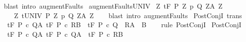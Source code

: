 \begin{isabellebody}
\ {\isacharparenleft}blast\ intro{\isacharcolon}\ augment{\isacharunderscore}Faults{\isacharparenright}%
\endisatagproof
{\isafoldproof}%
%
\isadelimproof
\isanewline
%
\endisadelimproof
\isanewline
{}\isamarkupfalse%
\ augment{\isacharunderscore}FaultsUNIV{\isacharcolon}\isanewline
\ {\isachardoublequoteopen}{\isasymlbrakk}{\isasymforall}Z{\isachardot}\ {\isasymGamma}{\isacharcomma}{\isacharbraceleft}{\isacharbraceright}{\isasymturnstile}\isactrlsub t\isactrlbsub {\isacharslash}F\isactrlesub \ {\isacharparenleft}P\ Z{\isacharparenright}\ p\ {\isacharparenleft}Q\ Z{\isacharparenright}{\isacharcomma}{\isacharparenleft}A\ Z{\isacharparenright}{\isasymrbrakk}\ {\isasymLongrightarrow}\ \isanewline
\ \ \ \ {\isasymforall}Z{\isachardot}\ {\isasymGamma}{\isacharcomma}{\isacharbraceleft}{\isacharbraceright}{\isasymturnstile}\isactrlsub t\isactrlbsub {\isacharslash}UNIV\isactrlesub \ {\isacharparenleft}P\ Z{\isacharparenright}\ p\ {\isacharparenleft}Q\ Z{\isacharparenright}{\isacharcomma}{\isacharparenleft}A\ Z{\isacharparenright}{\isachardoublequoteclose}\isanewline
%
\isadelimproof
\ \ %
\endisadelimproof
%
\isatagproof
{}\isamarkupfalse%
\ {\isacharparenleft}blast\ intro{\isacharcolon}\ augment{\isacharunderscore}Faults{\isacharparenright}%
\endisatagproof
{\isafoldproof}%
%
\isadelimproof
\isanewline
%
\endisadelimproof
\isanewline
{}\isamarkupfalse%
\ PostConjI\ {\isacharbrackleft}trans{\isacharbrackright}{\isacharcolon}\isanewline
\ \ {\isachardoublequoteopen}{\isasymlbrakk}{\isasymGamma}{\isacharcomma}{\isasymTheta}{\isasymturnstile}\isactrlsub t\isactrlbsub {\isacharslash}F\isactrlesub \ P\ c\ Q{\isacharcomma}A{\isacharsemicolon}\ {\isasymGamma}{\isacharcomma}{\isasymTheta}{\isasymturnstile}\isactrlsub t\isactrlbsub {\isacharslash}F\isactrlesub \ P\ c\ R{\isacharcomma}B{\isasymrbrakk}\ {\isasymLongrightarrow}\ {\isasymGamma}{\isacharcomma}{\isasymTheta}{\isasymturnstile}\isactrlsub t\isactrlbsub {\isacharslash}F\isactrlesub \ P\ c\ {\isacharparenleft}Q\ {\isasyminter}\ R{\isacharparenright}{\isacharcomma}{\isacharparenleft}A\ {\isasyminter}\ B{\isacharparenright}{\isachardoublequoteclose}\isanewline
%
\isadelimproof
\ \ %
\endisadelimproof
%
\isatagproof
{}\isamarkupfalse%
\ {\isacharparenleft}rule\ PostConjI{\isacharparenright}%
\endisatagproof
{\isafoldproof}%
%
\isadelimproof
\isanewline
%
\endisadelimproof
\isanewline
{}\isamarkupfalse%
\ PostConjI{\isacharprime}\ {\isacharcolon}\isanewline
\ \ {\isachardoublequoteopen}{\isasymlbrakk}{\isasymGamma}{\isacharcomma}{\isasymTheta}{\isasymturnstile}\isactrlsub t\isactrlbsub {\isacharslash}F\isactrlesub \ P\ c\ Q{\isacharcomma}A{\isacharsemicolon}\ {\isasymGamma}{\isacharcomma}{\isasymTheta}{\isasymturnstile}\isactrlsub t\isactrlbsub {\isacharslash}F\isactrlesub \ P\ c\ Q{\isacharcomma}A\ {\isasymLongrightarrow}\ {\isasymGamma}{\isacharcomma}{\isasymTheta}{\isasymturnstile}\isactrlsub t\isactrlbsub {\isacharslash}F\isactrlesub \ P\ c\ R{\isacharcomma}B{\isasymrbrakk}\ \isanewline

\end{isabellebody}
